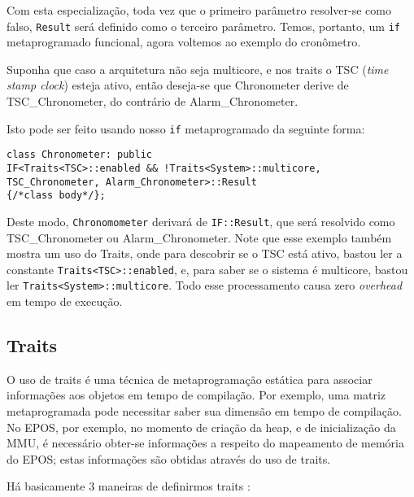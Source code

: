 Com esta especialização, toda vez que o primeiro parâmetro resolver-se como falso, \verb+Result+ será definido como o terceiro parâmetro. Temos, portanto, um \verb+if+ metaprogramado funcional, agora voltemos ao exemplo do cronômetro.

Suponha que caso a arquitetura não seja multicore, e nos traits o TSC (\emph{time stamp clock}) esteja ativo, então deseja-se que Chronometer derive de TSC\_Chronometer, do contrário de Alarm\_Chronometer.

Isto pode ser feito usando nosso \verb+if+ metaprogramado da seguinte forma:

\begin{lstlisting}
class Chronometer: public
IF<Traits<TSC>::enabled && !Traits<System>::multicore,
TSC_Chronometer, Alarm_Chronometer>::Result
{/*class body*/};
\end{lstlisting}

Deste modo, \verb+Chronomometer+ derivará de \verb+IF::Result+, que será resolvido como TSC\_Chronometer ou Alarm\_Chronometer. Note que esse exemplo também mostra um uso do Traits, onde para descobrir se o TSC está ativo, bastou ler a constante \verb+Traits<TSC>::enabled+, e, para saber se o sistema é multicore, bastou ler \verb+Traits<System>::multicore+. Todo esse processamento causa zero \emph{overhead} em tempo de execução.

\subsection{Traits}

O uso de traits é uma técnica de metaprogramação estática para associar informações aos objetos em tempo de compilação. Por exemplo, uma matriz metaprogramada pode necessitar saber sua dimensão em tempo de compilação. No EPOS, por exemplo, no momento de criação da heap, e de inicialização da MMU, é necessário obter-se informações a respeito do mapeamento de memória do EPOS; estas informações são obtidas através do uso de traits.

Há basicamente 3 maneiras de definirmos traits \cite{generative}:

